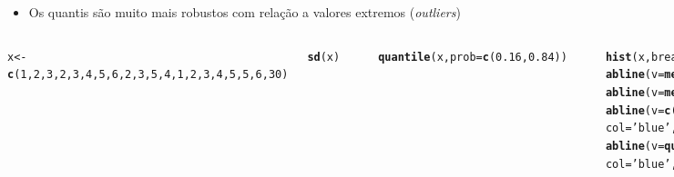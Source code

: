 \documentclass{beamer}\usepackage[]{graphicx}\usepackage[]{color}
\makeatletter
\newcommand{\hlnum}[1]{\textcolor[rgb]{0.686,0.059,0.569}{#1}}%
\newcommand{\hlstr}[1]{\textcolor[rgb]{0.192,0.494,0.8}{#1}}%
\newcommand{\hlcom}[1]{\textcolor[rgb]{0.678,0.584,0.686}{\textit{#1}}}%
\newcommand{\hlopt}[1]{\textcolor[rgb]{0,0,0}{#1}}%
\newcommand{\hlstd}[1]{\textcolor[rgb]{0.345,0.345,0.345}{#1}}%
\newcommand{\hlkwb}[1]{\textcolor[rgb]{0.69,0.353,0.396}{#1}}%
\newcommand{\hlkwc}[1]{\textcolor[rgb]{0.333,0.667,0.333}{#1}}%
\newcommand{\hlkwd}[1]{\textcolor[rgb]{0.737,0.353,0.396}{\textbf{#1}}}%
\newenvironment{kframe}{%
 \def\at@end@of@kframe{}%
 \ifinner\ifhmode%
  \def\at@end@of@kframe{\end{minipage}}%
  \begin{minipage}{\columnwidth}%
 \fi\fi%
 \def\FrameCommand##1{\hskip\@totalleftmargin \hskip-\fboxsep
 \colorbox{shadecolor}{##1}\hskip-\fboxsep
     \hskip-\linewidth \hskip-\@totalleftmargin \hskip\columnwidth}%
 \MakeFramed {\advance\hsize-\width
   \@totalleftmargin\z@ \linewidth\hsize
   \@setminipage}}%
 {\par\unskip\endMakeFramed%
 \at@end@of@kframe}
\newenvironment{knitrout}{}{} %
\renewenvironment{knitrout}{\setlength{\topsep}{0mm}}{}
\makeatother
\begin{document}
\begin{frame}[fragile]%

\begin{itemize}
  \item Os quantis são muito mais robustos com relação a valores extremos (\emph{outliers})
\end{itemize}
\begin{columns}[c]


\begin{knitrout}\tiny
{}\color{fgcolor}\begin{kframe}
\begin{alltt}
\hlstd{x} \hlkwb{<-} \hlkwd{c}\hlstd{(}\hlnum{1}\hlstd{,}\hlnum{2}\hlstd{,}\hlnum{3}\hlstd{,}\hlnum{2}\hlstd{,}\hlnum{3}\hlstd{,}\hlnum{4}\hlstd{,}\hlnum{5}\hlstd{,}\hlnum{6}\hlstd{,}\hlnum{2}\hlstd{,}\hlnum{3}\hlstd{,}\hlnum{5}\hlstd{,}\hlnum{4}\hlstd{,}\hlnum{1}\hlstd{,}\hlnum{2}\hlstd{,}\hlnum{3}\hlstd{,}\hlnum{4}\hlstd{,}\hlnum{5}\hlstd{,}\hlnum{5}\hlstd{,}\hlnum{6}\hlstd{,}\hlnum{30}\hlstd{)}

\hlkwd{sd}\hlstd{(x)}
\end{alltt}
\begin{verbatim}
## [1] 6.126732
\end{verbatim}
\begin{alltt}
\hlkwd{quantile}\hlstd{(x,}\hlkwc{prob}\hlstd{=}\hlkwd{c}\hlstd{(}\hlnum{0.16}\hlstd{,}\hlnum{0.84}\hlstd{))}
\end{alltt}
\begin{verbatim}
## 16% 84% 
##   2   5
\end{verbatim}
\begin{alltt}
\hlkwd{hist}\hlstd{(x,}\hlkwc{breaks}\hlstd{=}\hlnum{40}\hlstd{,}\hlkwc{prob}\hlstd{=T,,}\hlkwc{col}\hlstd{=}\hlstr{'gray70'}\hlstd{)}
\hlkwd{abline}\hlstd{(}\hlkwc{v}\hlstd{=}\hlkwd{mean}\hlstd{(x),}\hlkwc{col}\hlstd{=}\hlstr{'red'}\hlstd{,}\hlkwc{lwd}\hlstd{=}\hlnum{2}\hlstd{,}\hlkwc{lty}\hlstd{=}\hlnum{1}\hlstd{)}
\hlkwd{abline}\hlstd{(}\hlkwc{v}\hlstd{=}\hlkwd{median}\hlstd{(x),}\hlkwc{col}\hlstd{=}\hlstr{'red'}\hlstd{,}\hlkwc{lwd}\hlstd{=}\hlnum{2}\hlstd{,}\hlkwc{lty}\hlstd{=}\hlnum{2}\hlstd{)}
\hlkwd{abline}\hlstd{(}\hlkwc{v}\hlstd{=}\hlkwd{c}\hlstd{(}\hlkwd{mean}\hlstd{(x)}\hlopt{-}\hlkwd{sd}\hlstd{(x),}\hlkwd{mean}\hlstd{(x)}\hlopt{+}\hlkwd{sd}\hlstd{(x)),}\hlcom{#}
       \hlkwc{col}\hlstd{=}\hlstr{'blue'}\hlstd{,}\hlkwc{lwd}\hlstd{=}\hlnum{2}\hlstd{,}\hlkwc{lty}\hlstd{=}\hlnum{1}\hlstd{)}
\hlkwd{abline}\hlstd{(}\hlkwc{v}\hlstd{=}\hlkwd{quantile}\hlstd{(x,}\hlkwc{prob}\hlstd{=}\hlkwd{c}\hlstd{(}\hlnum{0.16}\hlstd{,}\hlnum{0.84}\hlstd{)),}\hlcom{#}
       \hlkwc{col}\hlstd{=}\hlstr{'blue'}\hlstd{,}\hlkwc{lwd}\hlstd{=}\hlnum{2}\hlstd{,}\hlkwc{lty}\hlstd{=}\hlnum{2}\hlstd{)}
\end{alltt}
\end{kframe}
\end{knitrout}


\end{columns}
\end{frame}
\end{document}
